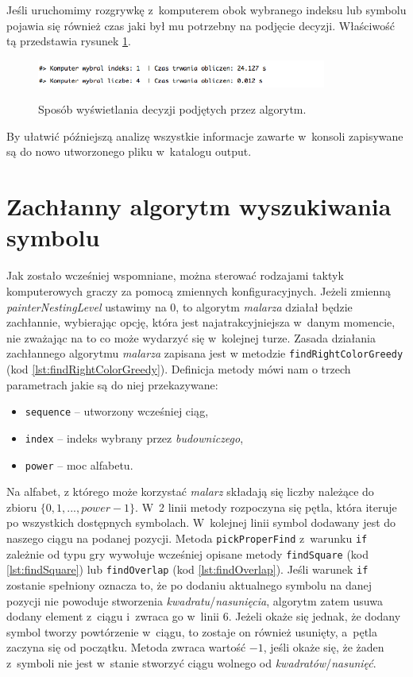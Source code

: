 \documentclass[document]{xmgr}
\begin{document}
Jeśli uruchomimy rozgrywkę z~komputerem obok wybranego indeksu lub symbolu pojawia się również czas jaki był mu potrzebny na podjęcie decyzji. Właściwość tą przedstawia rysunek \ref{fig:finish}.

\begin{figure}[tbh]
    \centering
    \caption{Sposób wyświetlania decyzji podjętych przez algorytm.}
    \includegraphics[width = 0.85\textwidth]{images2/finish1}
    \label{fig:finish}
\end{figure}

\noindent By ułatwić późniejszą analizę wszystkie informacje zawarte w~konsoli zapisywane są do nowo utworzonego pliku w~katalogu output.

\section{Zachłanny algorytm wyszukiwania symbolu}
Jak zostało wcześniej wspomniane, można sterować rodzajami taktyk komputerowych graczy za pomocą zmiennych konfiguracyjnych. Jeżeli zmienną \emph{painterNestingLevel} ustawimy na $0$, to algorytm \emph{malarza} działał będzie zachłannie, wybierając opcję, która jest najatrakcyjniejsza w~danym momencie, nie zważając na to co może wydarzyć się w~kolejnej turze. Zasada działania zachłannego algorytmu \emph{malarza} zapisana jest w metodzie \texttt{findRightColorGreedy} (kod \ref{lst:findRightColorGreedy}). Definicja metody mówi nam o trzech parametrach jakie są do niej przekazywane:
\begin{itemize}
\item \texttt{sequence} -- utworzony wcześniej ciąg,
\item \texttt{index} -- indeks wybrany przez \emph{budowniczego},
\item \texttt{power} -- moc alfabetu.
\end{itemize}
Na alfabet, z którego może korzystać \emph{malarz} składają się liczby należące do zbioru $\{0, 1, ..., power-1\}$. W~2 linii metody rozpoczyna się pętla, która iteruje po wszystkich dostępnych symbolach. W~kolejnej linii symbol dodawany jest do naszego ciągu na podanej pozycji. Metoda \texttt{pickProperFind} z~warunku \texttt{if} zależnie od typu gry wywołuje wcześniej opisane metody \texttt{findSquare} (kod \ref{lst:findSquare}) lub \texttt{findOverlap} (kod \ref{lst:findOverlap}). Jeśli warunek \texttt{if} zostanie spełniony oznacza to, że po dodaniu aktualnego symbolu na danej pozycji nie powoduje stworzenia \emph{kwadratu}/\emph{nasunięcia}, algorytm zatem usuwa dodany element z~ciągu i~zwraca go w~linii 6. Jeżeli  okaże się jednak, że dodany symbol tworzy powtórzenie w~ciągu, to zostaje on również usunięty, a~pętla zaczyna się od początku. Metoda zwraca wartość $-1$, jeśli okaże się, że żaden z~symboli nie jest w~stanie stworzyć ciągu wolnego od \emph{kwadratów}/\emph{nasunięć}.
\newpage
\end{document}
